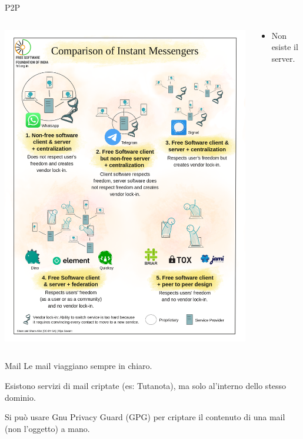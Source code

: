 \begin{myframe}{P2P}
  \begin{columns}
    \begin{column}{.5\textwidth}
      \includegraphics[width=.9\textwidth]{img/chat}
    \end{column}
    \begin{column}{.5\textwidth}
      \begin{itemize}[<+->]
        \item Non esiste il server.
      \end{itemize}
    \end{column}
  \end{columns}
\end{myframe}

\begin{myframe}{Mail}
  Le mail viaggiano sempre in chiaro.

  \medskip\pause
  Esistono servizi di mail criptate (es: Tutanota), ma solo al'interno dello stesso dominio.

  \bigskip\pause
  Si può usare Gnu Privacy Guard (GPG) per criptare il contenuto di una mail (non l'oggetto) a mano.
\end{myframe}


